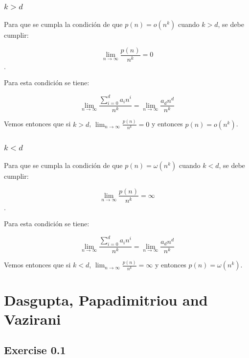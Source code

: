 \documentclass{article}
\begin{document}
\subsubsection{$k > d$}
Para que se cumpla la condición de que $p(n) = o(n^k)$ cuando $k > d$, se debe cumplir:

$$\lim_{n\to\infty} \frac{p(n)}{n^k} = 0$$.

Para esta condición se tiene:

$$\lim_{n\to\infty} \frac{\sum_{i=0}^{d} a_i n^i}{n^k} = \lim_{n\to\infty} \frac{a_d n^d}{n^k}$$

Vemos entonces que si $k > d$, $\lim_{n\to\infty} \frac{p(n)}{n^k} = 0$ y entonces $p(n) = o(n^k)$.

\subsubsection{$k < d$}
Para que se cumpla la condición de que $p(n) = \omega(n^k)$ cuando $k < d$, se debe cumplir:

$$\lim_{n\to\infty} \frac{p(n)}{n^k} = \infty$$.

Para esta condición se tiene:

$$\lim_{n\to\infty} \frac{\sum_{i=0}^{d} a_i n^i}{n^k} = \lim_{n\to\infty} \frac{a_d n^d}{n^k}$$

Vemos entonces que si $k < d$, $\lim_{n\to\infty} \frac{p(n)}{n^k} = \infty$ y entonces $p(n) = \omega(n^k)$.

\section{Dasgupta, Papadimitriou and  Vazirani}

\subsection{Exercise 0.1}
\end{document}
